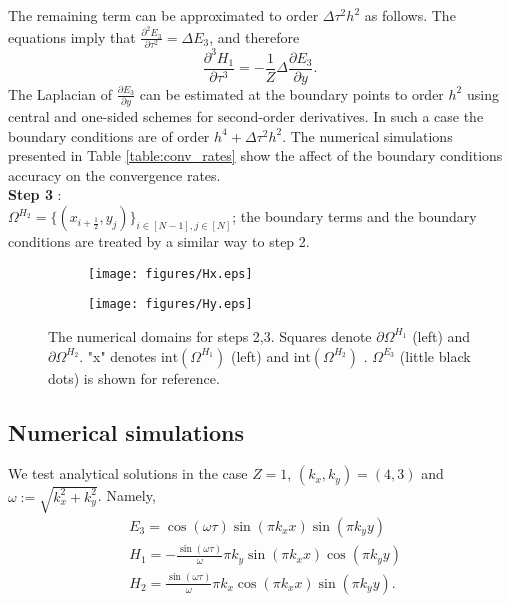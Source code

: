 \documentclass[12pt,reqno]{amsart}
\theoremstyle{definition}
\numberwithin{equation}{section}
\newcommand{\intr}[1]{\mathrm{int}(#1)}
\def\Gw{\Omega}     \def\Gx{\Xi}         \def\Gy{\Psi}
\begin{document}
	The remaining term 
	can be  approximated to order $\Delta \tau^2 h^2$ as follows.
	The equations imply that   $\frac{\partial^2E_3}{\partial \tau^2}=\Delta E_3$, and therefore
	$$
	\frac{\partial^3 H_1}{\partial \tau^3}=
	-\frac{1}{Z}\Delta \frac{\partial E_3 }{\partial y}.
	$$
	The Laplacian of $\frac{\partial E_3 }{\partial y}$ can be estimated at the boundary points  to order $h^2$ using central and one-sided schemes for second-order derivatives.
	In such a case the boundary conditions are of order $h^4+\Delta \tau^2h^2.$
	The numerical simulations   presented in  Table \ref{table:conv_rates} show the affect of the boundary conditions accuracy on the convergence rates.\\[1mm]
	{\bf Step 3} : \\ $\Gw^{H_2}=\{(x_{i+\frac{1}{2}},y_{j})\}_{i\in [N-1],j\in [N]}$; the boundary terms and the boundary conditions are treated by a similar way to step 2.
	
	\begin{figure}[!t]
		\centering
		\begin{subfigure}[h]{0.4\textwidth}
			\texttt{[image: figures/Hx.eps]}
		\end{subfigure}
		\begin{subfigure}[h]{0.4\textwidth}
			\texttt{[image: figures/Hy.eps]}
		\end{subfigure}
		\caption{The numerical domains for steps 2,3.
			Squares denote $\partial \Gw^{H_1}$ (left)  and $\partial \Gw^{H_2}$. "x" denotes $\intr{\Gw^{H_1}}$ (left) and $\intr{\Gw^{H_2}}$ . $\Gw^{E_3}$ (little black dots) is shown for reference.}
		\label{fig:Hx}			\end{figure}
	\subsection{Numerical simulations}
	We test analytical solutions in the case $Z=1$,  
	$(k_x,k_y)=(4,3)$ and $\omega:=\sqrt{k_x^2+k_y^2}$.
	Namely, 
	\begin{align*}
		&
		E_3=\cos(\omega \tau)
		\sin{\left( \pi  k_x x\right) } \sin{\left( \pi  k_y y\right) }
		\\ &
		H_1=-\frac{\sin( \omega \tau)}{\omega}
		\pi k_y \sin( \pi  k_x x)
		\cos{\left( \pi  k_y y\right) } \\&
		H_2=\frac{\sin\left( \omega \tau\right) }{\omega} \pi  k_x \cos{\left( \pi  k_x x\right) } \sin{\left( \pi  k_y y\right) }. \\&
	\end{align*}
	
\end{document}
